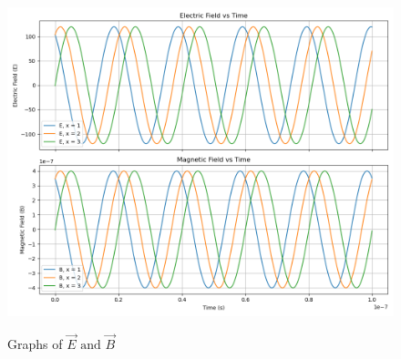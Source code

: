\documentclass[journal,12pt,twocolumn]{IEEEtran}
\theoremstyle{remark}
\begin{document}


\newpage
\renewcommand{\thefigure}{\theenumi}
\renewcommand{\thetable}{\theenumi}

\begin{flushleft}

\begin{figure}[h]
\renewcommand\thefigure{1}
  \caption{Graphs of $\vec{E} \text{ and } \vec{B}$}
  \includegraphics[width=1.05\columnwidth]{figs/Figure_1.png}
  \label{fig:fig1.12.8.8}

\end{figure}

\end{flushleft}
\end{document}
